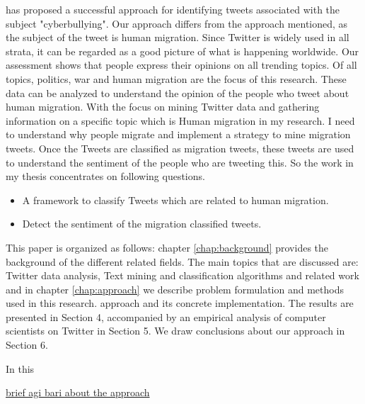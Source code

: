 \cite{Cortis} has proposed a successful approach for identifying tweets associated with the subject "cyberbullying". Our approach differs from the approach mentioned, as the subject of the tweet is human migration. Since Twitter is widely used in all strata, it can be regarded as a good picture of what is happening worldwide.  Our assessment shows that people express their opinions on all trending topics. Of all topics, politics, war and human migration are the focus of this research. These data can be analyzed to understand the opinion of the people who tweet about human migration.  With the focus on mining Twitter data and gathering information on a specific topic which is Human migration in my research. I need to understand why people migrate and implement a strategy to mine migration tweets. Once the Tweets are classified as migration tweets, these tweets are used to understand the sentiment of the people who are tweeting this. So the work in my thesis concentrates on following questions.


  

\begin{itemize}
  \item A framework to classify Tweets which are related to human migration.
  \item Detect the sentiment of the migration classified tweets. 
\end{itemize}

This paper is organized as follows: chapter \ref{chap:background}  provides the background of the different related fields.
The main topics that are discussed are: Twitter data analysis, Text mining and classification algorithms and related work and in chapter \ref{chap:approach} we describe problem formulation and methods used in this research.
approach and its concrete implementation. The results are
presented in Section 4, accompanied by an empirical analysis of computer scientists on Twitter in Section 5. We draw
conclusions about our approach in Section 6.


In this 


\underline{brief agi bari about the approach}

